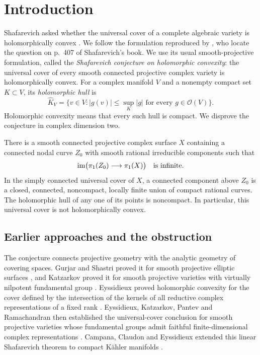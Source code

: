 \section{Introduction}
\label{sec:introduction}

Shafarevich asked whether the universal cover of a complete algebraic
variety is holomorphically convex \citep{Shafarevich1974}.
We follow the formulation reproduced by
\citet[pp.~135--137]{LasellRamachandran1996}, who locate the question
on p.~407 of Shafarevich's book.
We use its usual smooth-projective formulation, called the
\emph{Shafarevich conjecture on holomorphic convexity}: the universal
cover of every smooth connected projective complex variety is
holomorphically convex. For a complex manifold $V$ and a nonempty compact set $K\subset V$, its \emph{holomorphic hull} is
\[
 \widehat K_V=\{v\in V: |g(v)|\leq\sup_K|g|
                    \text{ for every }g\in\mathcal O(V)\}.
\]
Holomorphic convexity means that every such hull is compact. We disprove the conjecture in complex dimension two.

\begin{theorem}\label{thm:main}
There is a smooth connected projective complex surface $X$ containing a connected nodal curve $Z_0$ with smooth rational irreducible components such that
\[
 \operatorname{im}\bigl(\pi_1(Z_0)\longrightarrow\pi_1(X)\bigr)
 \quad\text{is infinite}.
\]
In the simply connected universal cover of $X$, a connected component above $Z_0$ is a closed, connected, noncompact, locally finite union of compact rational curves. The holomorphic hull of any one of its points is noncompact. In particular, this universal cover is not holomorphically convex.
\end{theorem}

\subsection{Earlier approaches and the obstruction}

The conjecture connects projective geometry with the analytic geometry
of covering spaces. Gurjar and Shastri proved it for smooth projective
elliptic surfaces \citep[Theorem~2(ii)]{GurjarShastri1985}, and
Katzarkov proved it for smooth projective varieties with virtually
nilpotent fundamental group \citep{Katzarkov1997}.
Eyssidieux proved holomorphic convexity for the cover defined by the
intersection of the kernels of all reductive complex representations
of a fixed rank \citep{Eyssidieux2004}. Eyssidieux, Katzarkov, Pantev
and Ramachandran then established the universal-cover conclusion for
smooth projective varieties whose fundamental groups admit faithful
finite-dimensional complex representations
\citep{EyssidieuxKatzarkovPantevRamachandran2012}.
Campana, Claudon and Eyssidieux extended this linear Shafarevich
theorem to compact K\"ahler manifolds
\citep{CampanaClaudonEyssidieux2015}.

